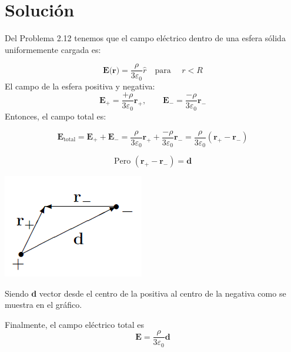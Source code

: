 \documentclass[12pt]{article}
\begin{document}
\section*{Solución}
Del Problema 2.12 tenemos que el campo eléctrico dentro de una esfera sólida uniformemente cargada es:

\[
\textbf{E(r)}= \frac{\rho}{3 \varepsilon_0} \hat{r} \quad \text{para } \quad r < R
\]
El campo de la esfera positiva y negativa:
\[
\textbf{E}_+ = \frac{+\rho}{3 \varepsilon_0} \textbf{r}_+, \qquad
\textbf{E}_- = \frac{-\rho}{3 \varepsilon_0} \textbf{r}_-
\]
Entonces, el campo total es:

\[
\textbf{E}_{\text{total}} = \textbf{E}_+ + \textbf{E}_- 
= \frac{\rho}{3 \varepsilon_0} \textbf{r}_+ + \frac{-\rho}{3 \varepsilon_0} \textbf{r}_-
= \frac{\rho}{3 \varepsilon_0} (\textbf{r}_+ - \textbf{r}_-)
\]

\[
\text{Pero } (\textbf{r}_+ - \textbf{r}_-) = \textbf{d}
\]

\begin{minipage}{0.25\textwidth}
    \includegraphics[width=\linewidth]{imagenes/4_IMG.png}
    \label{fig:}
\end{minipage}
\hfill
\begin{minipage}{0.6\textwidth}
    Siendo \textbf{d} vector desde el centro de la positiva al centro de la negativa como se muestra en el gráfico.
\end{minipage}

Finalmente, el campo eléctrico total es
\[
\boxed{\textbf{E} = \frac{\rho}{3 \varepsilon_0} \textbf{d}}
\]
\end{document}
